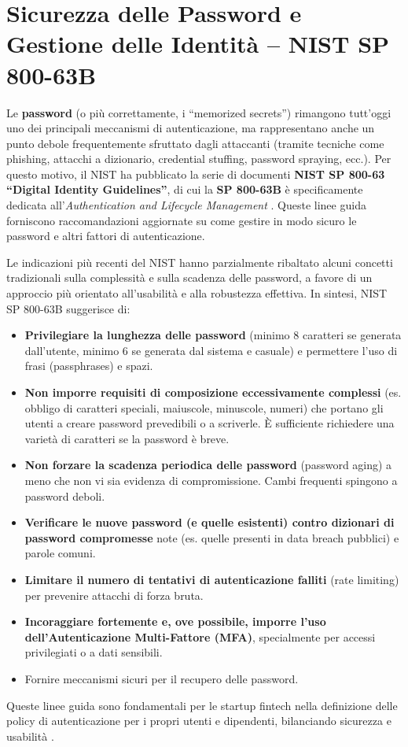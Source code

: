 \section{Sicurezza delle Password e Gestione delle Identità – NIST SP 800-63B}
\label{sec:sicurezza_password}
Le \textbf{password} (o più correttamente, i \enquote{memorized secrets}) rimangono tutt’oggi uno dei principali meccanismi di autenticazione, ma rappresentano anche un punto debole frequentemente sfruttato dagli attaccanti (tramite tecniche come phishing, attacchi a dizionario, credential stuffing, password spraying, ecc.). Per questo motivo, il NIST ha pubblicato la serie di documenti \textbf{NIST SP 800-63 \enquote{Digital Identity Guidelines}}, di cui la \textbf{SP 800-63B} è specificamente dedicata all'\textit{Authentication and Lifecycle Management} \cite{nistSP80063B}. Queste linee guida forniscono raccomandazioni aggiornate su come gestire in modo sicuro le password e altri fattori di autenticazione.

Le indicazioni più recenti del NIST hanno parzialmente ribaltato alcuni concetti tradizionali sulla complessità e sulla scadenza delle password, a favore di un approccio più orientato all'usabilità e alla robustezza effettiva. In sintesi, NIST SP 800-63B suggerisce di:
\begin{itemize}
    \item \textbf{Privilegiare la lunghezza delle password} (minimo 8 caratteri se generata dall'utente, minimo 6 se generata dal sistema e casuale) e permettere l'uso di frasi (passphrases) e spazi.
    \item \textbf{Non imporre requisiti di composizione eccessivamente complessi} (es. obbligo di caratteri speciali, maiuscole, minuscole, numeri) che portano gli utenti a creare password prevedibili o a scriverle. È sufficiente richiedere una varietà di caratteri se la password è breve.
    \item \textbf{Non forzare la scadenza periodica delle password} (password aging) a meno che non vi sia evidenza di compromissione. Cambi frequenti spingono a password deboli.
    \item \textbf{Verificare le nuove password (e quelle esistenti) contro dizionari di password compromesse} note (es. quelle presenti in data breach pubblici) e parole comuni.
    \item \textbf{Limitare il numero di tentativi di autenticazione falliti} (rate limiting) per prevenire attacchi di forza bruta.
    \item \textbf{Incoraggiare fortemente e, ove possibile, imporre l'uso dell'Autenticazione Multi-Fattore (MFA)}, specialmente per accessi privilegiati o a dati sensibili.
    \item Fornire meccanismi sicuri per il recupero delle password.
\end{itemize}
Queste linee guida sono fondamentali per le startup fintech nella definizione delle policy di autenticazione per i propri utenti e dipendenti, bilanciando sicurezza e usabilità \cite{jumpcloudNistPassword}.

